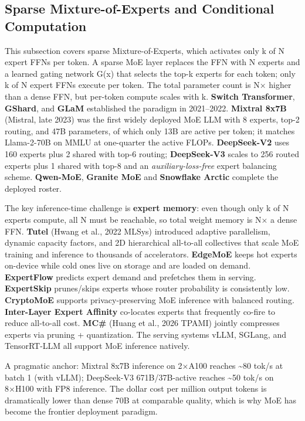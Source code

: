 \documentclass{article}
\begin{document}
\subsection{Sparse Mixture-of-Experts and Conditional Computation}\label{sparse-mixture-of-experts-and-conditional-computation}

This subsection covers sparse Mixture-of-Experts, which activates only k of N expert FFNs per token. A sparse MoE layer replaces the FFN with N experts and a learned gating network G(x) that selects the top-k experts for each token; only k of N expert FFNs execute per token. The total parameter count is N× higher than a dense FFN, but per-token compute scales with k. \textbf{Switch Transformer}, \textbf{GShard}, and \textbf{GLaM} established the paradigm in 2021--2022. \textbf{Mixtral 8x7B} (Mistral, late 2023) was the first widely deployed MoE LLM with 8 experts, top-2 routing, and 47B parameters, of which only 13B are active per token; it matches Llama-2-70B on MMLU at one-quarter the active FLOPs. \textbf{DeepSeek-V2} uses 160 experts plus 2 shared with top-6 routing; \textbf{DeepSeek-V3} scales to 256 routed experts plus 1 shared with top-8 and an \emph{auxiliary-loss-free} expert balancing scheme. \textbf{Qwen-MoE}, \textbf{Granite MoE} and \textbf{Snowflake Arctic} complete the deployed roster.

The key inference-time challenge is \textbf{expert memory}: even though only k of N experts compute, all N must be reachable, so total weight memory is N× a dense FFN. \textbf{Tutel} (Hwang et al., 2022 MLSys) introduced adaptive parallelism, dynamic capacity factors, and 2D hierarchical all-to-all collectives that scale MoE training and inference to thousands of accelerators. \textbf{EdgeMoE} \citep{yi20232023} keeps hot experts on-device while cold ones live on storage and are loaded on demand. \textbf{ExpertFlow} \citep{he20242024} predicts expert demand and prefetches them in serving. \textbf{ExpertSkip} \citep{lu20242024} prunes/skips experts whose router probability is consistently low. \textbf{CryptoMoE} \citep{zhou20252025} supports privacy-preserving MoE inference with balanced routing. \textbf{Inter-Layer Expert Affinity} \citep{yao20242024} co-locates experts that frequently co-fire to reduce all-to-all cost. \textbf{MC\#} (Huang et al., 2026 TPAMI) jointly compresses experts via pruning + quantization. The serving systems vLLM, SGLang, and TensorRT-LLM all support MoE inference natively.

A pragmatic anchor: Mixtral 8x7B inference on 2×A100 reaches \textasciitilde80 tok/s at batch 1 (with vLLM); DeepSeek-V3 671B/37B-active reaches \textasciitilde50 tok/s on 8×H100 with FP8 inference. The dollar cost per million output tokens is dramatically lower than dense 70B at comparable quality, which is why MoE has become the frontier deployment paradigm.
\end{document}
